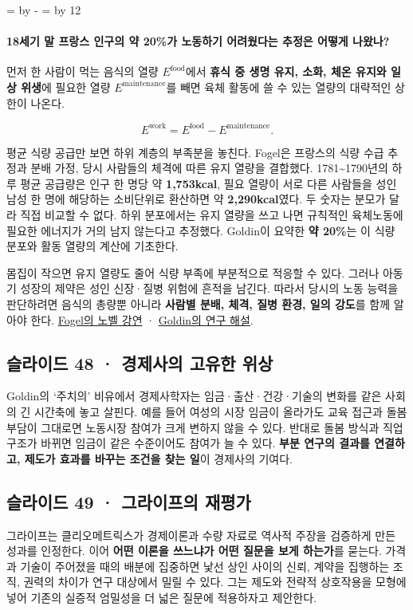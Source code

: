 \documentclass[10pt,a4paper]{article}
\newcommand{\ReserveQuestionSpace}{%
  \par\begingroup
  \dimen0=\pagegoal \advance\dimen0 by -\pagetotal
  \dimen2=\baselineskip \multiply\dimen2 by 12
  \ifdim\dimen0<\dimen2 \newpage\fi
  \endgroup}
\begin{document}
\ReserveQuestionSpace
\paragraph{18세기 말 프랑스 인구의 약 20\%가 노동하기 어려웠다는 추정은 어떻게 나왔나?}
먼저 한 사람이 먹는 음식의 열량 $E^{\mathrm{food}}$에서 \textbf{휴식 중 생명 유지, 소화, 체온 유지와 일상 위생}에 필요한 열량 $E^{\mathrm{maintenance}}$를 빼면 육체 활동에 쓸 수 있는 열량의 대략적인 상한이 나온다.\par

\[
E^{\mathrm{work}}=E^{\mathrm{food}}-E^{\mathrm{maintenance}}.
\]

평균 식량 공급만 보면 하위 계층의 부족분을 놓친다. Fogel은 프랑스의 식량 수급 추정과 분배 가정, 당시 사람들의 체격에 따른 유지 열량을 결합했다. 1781\textasciitilde{}1790년의 하루 평균 공급량은 인구 한 명당 약 \textbf{1,753kcal}, 필요 열량이 서로 다른 사람들을 성인 남성 한 명에 해당하는 소비단위로 환산하면 약 \textbf{2,290kcal}였다. 두 숫자는 분모가 달라 직접 비교할 수 없다. 하위 분포에서는 유지 열량을 쓰고 나면 규칙적인 육체노동에 필요한 에너지가 거의 남지 않는다고 추정했다. Goldin이 요약한 \textbf{약 20\%}는 이 식량 분포와 활동 열량의 계산에 기초한다.\par

몸집이 작으면 유지 열량도 줄어 식량 부족에 부분적으로 적응할 수 있다. 그러나 아동기 성장의 제약은 성인 신장·질병 위험에 흔적을 남긴다. 따라서 당시의 노동 능력을 판단하려면 음식의 총량뿐 아니라 \textbf{사람별 분배, 체격, 질병 환경, 일의 강도}를 함께 알아야 한다. \href{https://www.nobelprize.org/uploads/2018/06/fogel-lecture.pdf}{Fogel의 노벨 강연} · \href{https://goldin.scholars.harvard.edu/sites/g/files/omnuum5966/files/goldin/files/cliometrics.pdf}{Goldin의 연구 해설}.\par

\subsection{슬라이드 48 · 경제사의 고유한 위상}
Goldin의 ‘주치의’ 비유에서 경제사학자는 임금·출산·건강·기술의 변화를 같은 사회의 긴 시간축에 놓고 살핀다. 예를 들어 여성의 시장 임금이 올라가도 교육 접근과 돌봄 부담이 그대로면 노동시장 참여가 크게 변하지 않을 수 있다. 반대로 돌봄 방식과 직업 구조가 바뀌면 임금이 같은 수준이어도 참여가 늘 수 있다. \textbf{부분 연구의 결과를 연결하고, 제도가 효과를 바꾸는 조건을 찾는 일}이 경제사의 기여다.\par

\subsection{슬라이드 49 · 그라이프의 재평가}
그라이프는 클리오메트릭스가 경제이론과 수량 자료로 역사적 주장을 검증하게 만든 성과를 인정한다. 이어 \textbf{어떤 이론을 쓰느냐가 어떤 질문을 보게 하는가}를 묻는다. 가격과 기술이 주어졌을 때의 배분에 집중하면 낯선 상인 사이의 신뢰, 계약을 집행하는 조직, 권력의 차이가 연구 대상에서 밀릴 수 있다. 그는 제도와 전략적 상호작용을 모형에 넣어 기존의 실증적 엄밀성을 더 넓은 질문에 적용하자고 제안한다.\par
\end{document}
